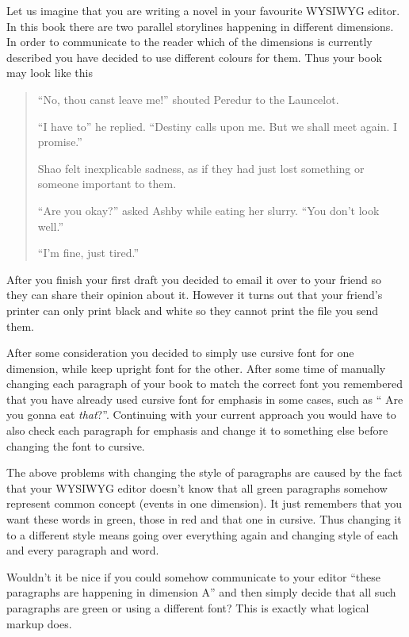 Let us imagine that you are writing a novel in your favourite WYSIWYG editor. In
this book there are two parallel storylines happening in different dimensions.
In order to communicate to the reader which of the dimensions is currently
described you have decided to use different colours for them. Thus your book may
look like this
\begin{quotation}
  {\color[HTML]{B71C1C}

    \enquote{No, thou canst leave me!} shouted Peredur to the Launcelot.

    \enquote{I have to} he replied. \enquote{Destiny calls upon me. But we shall
      meet again. I promise.} }

  {\color[HTML]{2E7D32}

    Shao felt inexplicable sadness, as if they had just lost something or
    someone important to them.

    \enquote{Are you okay?} asked Ashby while eating her slurry. \enquote{You
      don't look well.}

    \enquote{I'm fine, just tired.}
  }
\end{quotation}

After you finish your first draft you decided to email it over to your friend
so they can share their opinion about it. However it turns out that your
friend's printer can only print black and white so they cannot print the file
you send them.

After some consideration you decided to simply use cursive font for one
dimension, while keep upright font for the other. After some time of manually
changing each paragraph of your book to match the correct font you remembered
that you have already used cursive font for emphasis in some cases, such as
\enquote{{\color[HTML]{2E7D32} Are you gonna eat \emph{that}?}}. Continuing
with your current approach you would have to also check each paragraph for
emphasis and change it to something else before changing the font to cursive.

The above problems with changing the style of paragraphs are caused by the fact
that your WYSIWYG editor doesn't know that all green paragraphs somehow
represent common concept (events in one dimension). It just remembers that you
want these words in green, those in red and that one in cursive. Thus changing
it to a different style means going over everything again and changing style of
each and every paragraph and word.

Wouldn't it be nice if you could somehow communicate to your editor
\enquote{these paragraphs are happening in dimension A} and then simply decide
that all such paragraphs are green or using a different font? This is exactly
what logical markup does.

